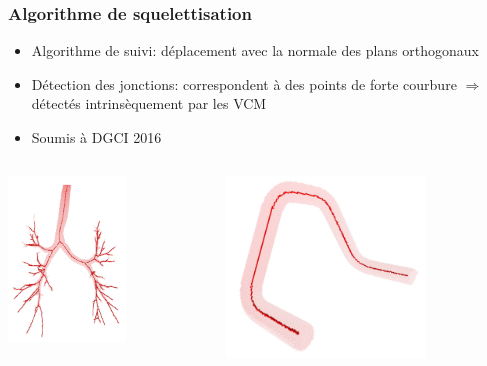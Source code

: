 \documentclass{beamer}
\begin{document}
\begin{frame}
	\frametitle{Algorithme de squelettisation}
	\begin{itemize}
		\item Algorithme de suivi: déplacement avec la normale des plans orthogonaux
		\item Détection des jonctions: correspondent à des points de forte courbure $\Rightarrow$ détectés intrinsèquement par les VCM
				
		\item Soumis à DGCI 2016
	\end{itemize}
		
	\begin{columns}[onlytextwidth]
		\begin{column}{0.48\textwidth}
			\centering
			\includegraphics[width=0.6\textwidth]{fig/skeletonBronche2.png}
		\end{column}
					
		\begin{column}{0.48\textwidth}
			\centering
			\includegraphics[width=0.7\textwidth]{fig/tubeBK.png}
		\end{column}		
	\end{columns}
			
			
\end{frame}


\logo{}
\end{document}

